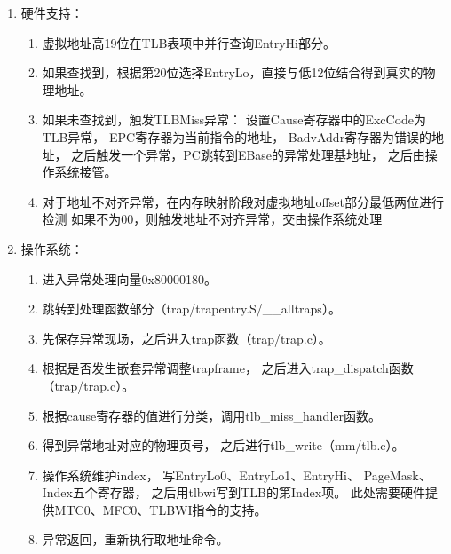 \begin{enumerate}
            \item
                硬件支持：
                \begin{enumerate}
                \item
                    虚拟地址高19位在TLB表项中并行查询EntryHi部分。
                \item
                    如果查找到，根据第20位选择EntryLo，直接与低12位结合得到真实的物理地址。
                \item
                    如果未查找到，触发TLBMiss异常：%
                    设置Cause寄存器中的ExcCode为TLB异常，%
                    EPC寄存器为当前指令的地址，%
                    BadvAddr寄存器为错误的地址，%
                    之后触发一个异常，PC跳转到EBase的异常处理基地址，%
                    之后由操作系统接管。
                \item
                    对于地址不对齐异常，在内存映射阶段对虚拟地址offset部分最低两位进行检测%
                    如果不为00，则触发地址不对齐异常，交由操作系统处理
                \end{enumerate}
            \item
                操作系统：
                \begin{enumerate}
                \item
                    进入异常处理向量0x80000180。
                \item
                    跳转到处理函数部分（trap/trapentry.S/\_\_alltraps）。
                \item
                    先保存异常现场，之后进入trap函数（trap/trap.c）。
                \item
                    根据是否发生嵌套异常调整trapframe，%
                    之后进入trap\_dispatch函数（trap/trap.c）。
                \item
                    根据cause寄存器的值进行分类，调用tlb\_miss\_handler函数。
                \item
                    得到异常地址对应的物理页号，%
                    之后进行tlb\_write（mm/tlb.c）。
                \item
                    操作系统维护index，%
                    写EntryLo0、EntryLo1、EntryHi、 PageMask、Index五个寄存器，%
                    之后用tlbwi写到TLB的第Index项。%
                    此处需要硬件提供MTC0、MFC0、TLBWI指令的支持。
                \item
                    异常返回，重新执行取地址命令。%
                \end{enumerate}
            \end{enumerate}

